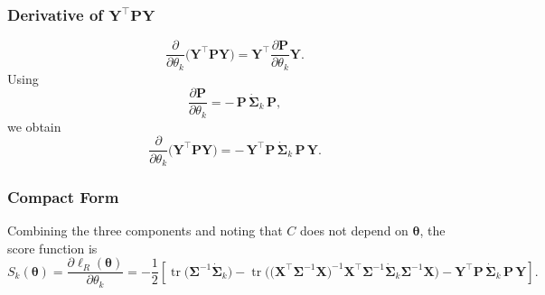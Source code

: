 \documentclass[
  letterpaper,
  DIV=11,
  numbers=noendperiod]{scrartcl}
\begin{document}
\subsubsection{\texorpdfstring{Derivative of
\(\symbf{Y}^\top \symbf{P}\symbf{Y}\)}{Derivative of \textbackslash symbf\{Y\}\^{}\textbackslash top \textbackslash symbf\{P\}\textbackslash symbf\{Y\}}}\label{derivative-of-symbfytop-symbfpsymbfy}

\begin{equation}
\frac{\partial}{\partial \theta_k}
\big(\symbf{Y}^\top \symbf{P}\symbf{Y}\big)
=
\symbf{Y}^\top
\frac{\partial \symbf{P}}{\partial \theta_k}
\symbf{Y}.
\end{equation} Using \begin{equation}
\frac{\partial \symbf{P}}{\partial \theta_k}
=
-\,\symbf{P}\,\dot{\symbf{\Sigma}}_k\,\symbf{P},
\end{equation} we obtain \begin{equation}
\frac{\partial}{\partial \theta_k}
\big(\symbf{Y}^\top \symbf{P}\symbf{Y}\big)
=
-\,\symbf{Y}^\top \symbf{P}\,\dot{\symbf{\Sigma}}_k\,\symbf{P}\,\symbf{Y}.
\end{equation}

\subsubsection{Compact Form}\label{compact-form}

Combining the three components and noting that \(C\) does not depend on
\(\symbf{\theta}\), the score function is \begin{equation}
S_k(\symbf{\theta})
=
\frac{\partial \ell_R(\symbf{\theta})}{\partial \theta_k}
=
-\frac{1}{2}
\left[
\operatorname{tr}\!\big(\symbf{\Sigma}^{-1}\dot{\symbf{\Sigma}}_k\big)
-
\operatorname{tr}\!\Big(
\big(\symbf{X}^\top \symbf{\Sigma}^{-1}\symbf{X}\big)^{-1}
\symbf{X}^\top \symbf{\Sigma}^{-1}
\dot{\symbf{\Sigma}}_k
\symbf{\Sigma}^{-1}\symbf{X}
\Big)
-
\symbf{Y}^\top \symbf{P}\,\dot{\symbf{\Sigma}}_k\,\symbf{P}\,\symbf{Y}
\right].
\end{equation}
\end{document}
